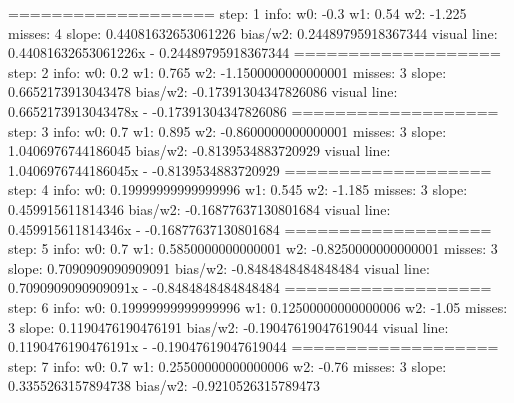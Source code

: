 \documentclass[11pt]{article}
\begin{document}
\begin{enumerate}
=================== \newline
step: 1 info: w0: -0.3 w1: 0.54 w2: -1.225 misses: 4 \newline
		slope: 0.44081632653061226 bias/w2: 0.24489795918367344 \newline
	visual line: 0.44081632653061226x - 0.24489795918367344 \newline
=================== \newline
step: 2 info: w0: 0.2 w1: 0.765 w2: -1.1500000000000001 misses: 3 \newline
		slope: 0.6652173913043478 bias/w2: -0.17391304347826086 \newline
	visual line: 0.6652173913043478x - -0.17391304347826086 \newline
=================== \newline
step: 3 info: w0: 0.7 w1: 0.895 w2: -0.8600000000000001 misses: 3 \newline
		slope: 1.0406976744186045 bias/w2: -0.8139534883720929 \newline
	visual line: 1.0406976744186045x - -0.8139534883720929 \newline
=================== \newline
step: 4 info: w0: 0.19999999999999996 w1: 0.545 w2: -1.185 misses: 3 \newline
		slope: 0.459915611814346 bias/w2: -0.16877637130801684 \newline
	visual line: 0.459915611814346x - -0.16877637130801684 \newline
=================== \newline
step: 5 info: w0: 0.7 w1: 0.5850000000000001 w2: -0.8250000000000001 misses: 3 \newline
		slope: 0.7090909090909091 bias/w2: -0.8484848484848484 \newline
	visual line: 0.7090909090909091x - -0.8484848484848484 \newline
=================== \newline
step: 6 info: w0: 0.19999999999999996 w1: 0.12500000000000006 w2: -1.05 misses: 3 \newline
		slope: 0.1190476190476191 bias/w2: -0.19047619047619044 \newline
	visual line: 0.1190476190476191x - -0.19047619047619044 \newline
=================== \newline
step: 7 info: w0: 0.7 w1: 0.25500000000000006 w2: -0.76 misses: 3 \newline
		slope: 0.3355263157894738 bias/w2: -0.9210526315789473 \newline

\end{enumerate}
\end{document}
